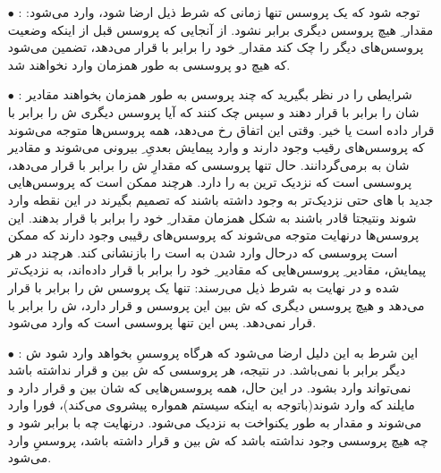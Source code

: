 \documentclass{article}
\begin{document}
\begin{itemize}
    \item [$\bullet$] : توجه شود که یک پروسس تنها زمانی که شرط ذیل ارضا شود، وارد  می‌شود:
\newline
مقدار ِ هیچ پروسس دیگری برابر  نشود. از آنجایی که پروسس قبل از اینکه وضعیت پروسس‌های دیگر را چک کند مقدار ِ خود را برابر با  قرار می‌دهد، تضمین می‌شود که هیچ دو پروسسی به طور همزمان وارد  نخواهند شد.

    \item [$\bullet$] : شرایطی را در نظر بگیرید که چند پروسس به طور همزمان بخواهند مقادیر شان را برابر با  قرار دهند و سپس چک کنند که آیا پروسس دیگری ش را برابر با  قرار داده است یا خیر. وقتی این اتفاق رخ می‌دهد، همه پروسس‌ها متوجه می‌شوند که پروسس‌های رقیب وجود دارند و وارد پیمایش بعدیِ ِ بیرونی می‌شوند و مقادیر شان به  برمی‌گردانند. حال تنها پروسسی که مقدارِ ش را برابر با  قرار می‌دهد، پروسسی است که نزدیک ترین  به  را دارد. هرچند ممکن است که پروسس‌هایی جدید با های حتی نزدیک‌تر به  وجود داشته باشند که تصمیم بگیرند در این نقطه وارد  شوند ونتیجتا قادر باشند به شکل همزمان مقدار ِ خود را برابر با  قرار بدهند. این پروسس‌ها درنهایت متوجه می‌شوند که پروسس‌های رقیبی وجود دارند که ممکن است پروسسی که درحال وارد شدن به  است را بازنشانی کند. هرچند در هر پیمایش، مقادیر ِ پروسس‌هایی که مقادیر ِ خود را برابر با  قرار داده‌اند، به  نزدیک‌تر شده و در نهایت به شرط ذیل می‌رسند:
\newline
تنها یک پروسس ش را برابر با  قرار می‌دهد و هیچ پروسس دیگری که ش بین این پروسس و  قرار دارد، ش را برابر با  قرار نمی‌دهد. پس این تنها پروسسی است که وارد  می‌شود.

    \item [$\bullet$] : این شرط به این دلیل ارضا می‌شود که هرگاه پروسسِ  بخواهد وارد  شود ش دیگر برابر با  نمی‌باشد. در نتیجه، هر پروسسی که ش بین  و  قرار نداشته باشد نمی‌تواند وارد  بشود. در این حال، همه پروسس‌هایی که شان بین  و  قرار دارد و مایلند که وارد  شوند(باتوجه به اینکه سیستم همواره پیشروی می‌کند)، فورا وارد  می‌شوند و مقدار  به طور یکنواخت به  نزدیک می‌شود. درنهایت چه  با  برابر شود و چه هیچ پروسسی وجود نداشته باشد که ش بین  و  قرار داشته باشد، پروسسِ  وارد  می‌شود.
\end{itemize}
\end{document}
